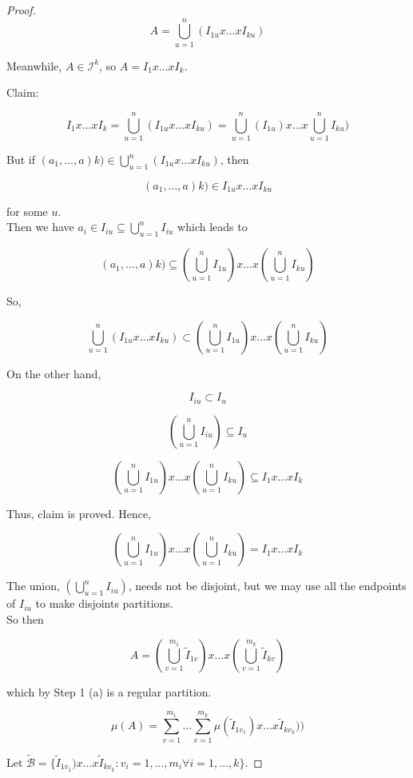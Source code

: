 \documentclass[11pt,fleqn]{book} %
\begin{document}
\begin{proof}
				$$ A = \bigcup^n_{u = 1} (I _{1u} x \dots x I_{ku})$$

		Meanwhile, $A \in \mathcal{I}^k$, so $A = I_1 x \dots x I_k$. 

		Claim:

				$$I_1 x \dots x I_k = \bigcup^n_{u = 1} (I _{1u} x \dots x I_{ku}) = \bigcup^n_{u = 1} (I _{1u})  x \dots x  \bigcup^n_{u = 1} I_{ku})$$ 


		But if $(a_1, \dots, a)k) \in \bigcup^n_{u = 1} (I _{1u} x \dots x I_{ku})$, then

				$$ (a_1, \dots, a)k) \in I _{1u} x \dots x I_{ku}$$

		for some $u$.\\


		Then we have $a_i \in I_{iu} \subseteq \bigcup^n_{u = 1} I_{iu}$ which leads to 

				$$ (a_1, \dots, a)k) \subseteq (\bigcup^n_{u = 1} I _{1u}) x \dots x (\bigcup^n_{u = 1} I_{ku})$$


		So, 

				$$\bigcup^n_{u = 1} (I _{1u} x \dots x I_{ku}) \subset (\bigcup^n_{u = 1} I _{1u}) x \dots x (\bigcup^n_{u = 1} I_{ku})$$


		On the other hand, 

				$$I_{iu} \subset I_u $$

				$$(\bigcup^n_{u = 1} I _{iu}) \subseteq I_u $$

				$$(\bigcup^n_{u = 1} I _{1u}) x \dots x (\bigcup^n_{u = 1} I_{ku}) \subseteq I_1 x \dots x I_k $$


		Thus, claim is proved. Hence, 
				
				$$(\bigcup^n_{u = 1} I _{1u}) x \dots x (\bigcup^n_{u = 1} I_{ku}) = I_1 x \dots x I_k $$

			The union, $ (\bigcup^n_{u = 1} I _{iu}) $, needs not be disjoint, but we may use all the endpoints of $I_{iu}$ to make disjoints partitions. \\



			So then 

					$$A =  (\bigcup^{m_1}_{v = 1} \tilde{I} _{1v}) x \dots x (\bigcup^{m_k}_{v = 1} \tilde{I}_{kv})$$

			which by Step 1 (a) is a regular partition. 

					$$ \mu(A) = \sum^{m_1}_{v = 1} \dots \sum^{m_k}_{v = 1} \mu (\tilde{I} _{1 v_1}) x \dots x \tilde{I} _{k v_k }))$$


			Let $\tilde{\mathcal{B}} = \{\tilde{I} _{1 v_1}) x \dots x \tilde{I} _{k v_k }: v_i = 1, \dots, m_i \forall i = 1, \dots, k\}$. 



\end{proof}
\end{document}
